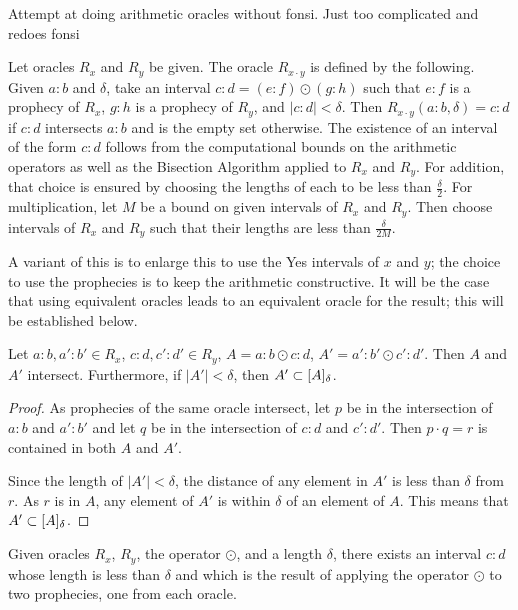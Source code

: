 
Attempt at doing arithmetic oracles without fonsi.  Just too complicated and redoes fonsi


Let oracles $R_x$ and $R_y$ be given. The oracle $R_{x \cdot y}$ is defined by the following. Given $a:b$ and $\delta$, take an interval $c:d = (e:f) \odot (g:h)$ such that $e:f$ is a prophecy of $R_x$, $g:h$ is a prophecy of $R_y$, and $|c:d| < \delta$. Then $R_{x \cdot y}(a:b, \delta) = c:d$ if $c:d$ intersects $a:b$ and is the empty set otherwise. 
The existence of an interval of the form $c:d$ follows from the computational bounds on the arithmetic operators as well as the Bisection Algorithm applied to $R_x$ and $R_y$. For addition, that choice is ensured by choosing the lengths of each to be less than $\frac{\delta}{2}$. For multiplication, let $M$ be a bound on given intervals of $R_x$ and $R_y$. Then choose intervals of $R_x$ and $R_y$ such that their lengths are less than $\frac{\delta}{2M}$. 

 A variant of this is to enlarge this to use the Yes intervals of $x$ and $y$; the choice to use the prophecies is to keep the arithmetic constructive. It will be the case that using equivalent oracles leads to an equivalent oracle for the result; this will be established below. 

\begin{lemma}
    Let $a:b, a':b' \in R_{x}$, $c:d, c':d' \in R_y$, $A =  a:b \odot c:d$, $A' =  a':b' \odot c':d'$. Then $A$ and $A'$ intersect. Furthermore, if $|A'| < \delta$, then $A' \subset [A]_{\delta}$.
\end{lemma}

\begin{proof}   
    As prophecies of the same oracle intersect, let $p$ be in the intersection of $a:b$ and $a':b'$ and let $q$ be in the intersection of $c:d$ and $c':d'$. Then $p \cdot q = r$ is contained in both $A$ and $A'$. 
    
    Since the length of $|A'| < \delta$, the distance of any element in $A'$ is less than $\delta$ from $r$. As $r$ is in $A$, any element of $A'$ is within $\delta$ of an element of $A$. This means that $A' \subset [A]_{\delta}$.
\end{proof}


\begin{lemma}
    Given oracles $R_x$, $R_y$, the operator $\odot$, and a length $\delta$, there exists an interval $c:d$ whose length is less than $\delta$ and which is the result of applying the operator $\odot$ to two prophecies, one from each oracle. 
\end{lemma}

